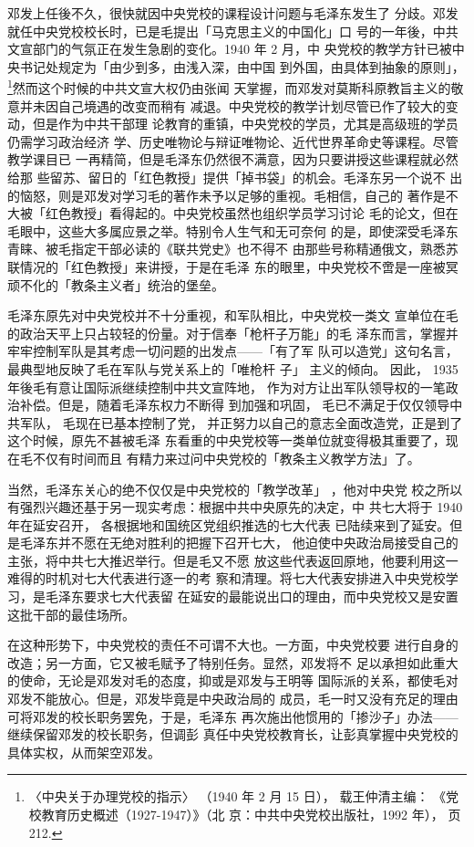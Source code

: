 邓发上任後不久，很快就因中央党校的课程设计问题与毛泽东发生了
分歧。邓发就任中央党校校长时，已是毛提出「马克思主义的中国化」口
号的一年後，中共文宣部门的气氛正在发生急剧的变化。1940 年 2 月，中
央党校的教学方针已被中央书记处规定为「由少到多，由浅入深，由中国
到外国，由具体到抽象的原则」， \footnote{〈中央关于办理党校的指示〉
（1940 年 2 月 15 日），
载王仲清主编：
《党校教育历史概述（1927-1947）》（北
京：中共中央党校出版社，1992 年），
页 212.}然而这个时候的中共文宣大权仍由张闻
天掌握，而邓发对莫斯科原教旨主义的敬意并未因自己境遇的改变而稍有
减退。中央党校的教学计划尽管已作了较大的变动，但是作为中共干部理
论教育的重镇，中央党校的学员，尤其是高级班的学员仍需学习政治经济
学、历史唯物论与辩证唯物论、近代世界革命史等课程。尽管教学课目已
一再精简，但是毛泽东仍然很不满意，因为只要讲授这些课程就必然给那
些留苏、留日的「红色教授」提供「掉书袋」的机会。毛泽东另一个说不
出的恼怒，则是邓发对学习毛的著作未予以足够的重视。毛相信，自己的
著作是不大被「红色教授」看得起的。中央党校虽然也组织学员学习讨论
毛的论文，但在毛眼中，这些大多属应景之举。特别令人生气和无可奈何
的是，即使深受毛泽东青睐、被毛指定干部必读的《联共党史》也不得不
由那些号称精通俄文，熟悉苏联情况的「红色教授」来讲授，于是在毛泽
东的眼里，中央党校不啻是一座被冥顽不化的「教条主义者」统治的堡垒。

毛泽东原先对中央党校并不十分重视，和军队相比，中央党校一类文
宣单位在毛的政治天平上只占较轻的份量。对于信奉「枪杆子万能」的毛
泽东而言，掌握并牢牢控制军队是其考虑一切问题的出发点——「有了军
队可以造党」这句名言，最典型地反映了毛在军队与党关系上的「唯枪杆
子」
主义的倾向。
因此，
1935 年後毛有意让国际派继续控制中共文宣阵地，
作为对方让出军队领导权的一笔政治补偿。但是，随着毛泽东权力不断得
到加强和巩固，
毛已不满足于仅仅领导中共军队，
毛现在已基本控制了党，
并正努力以自己的意志全面改造党，正是到了这个时候，原先不甚被毛泽
东看重的中央党校等一类单位就变得极其重要了，现在毛不仅有时间而且
有精力来过问中央党校的「教条主义教学方法」了。

当然，毛泽东关心的绝不仅仅是中央党校的「教学改革」
，他对中央党
校之所以有强烈兴趣还基于另一现实考虑：根据中共中央原先的决定，中
共七大将于 1940 年在延安召开，
各根据地和国统区党组织推选的七大代表
已陆续来到了延安。但是毛泽东并不愿在无绝对胜利的把握下召开七大，
他迫使中央政治局接受自己的主张，将中共七大推迟举行。但是毛又不愿
放这些代表返回原地，他要利用这一难得的时机对七大代表进行逐一的考
察和清理。将七大代表安排进入中央党校学习，是毛泽东要求七大代表留
在延安的最能说出口的理由，而中央党校又是安置这批干部的最佳场所。

在这种形势下，中央党校的责任不可谓不大也。一方面，中央党校要
进行自身的改造；另一方面，它又被毛赋予了特别任务。显然，邓发将不
足以承担如此重大的使命，无论是邓发对毛的态度，抑或是邓发与王明等
国际派的关系，都使毛对邓发不能放心。但是，邓发毕竟是中央政治局的
成员，毛一时又没有充足的理由可将邓发的校长职务罢免，于是，毛泽东
再次施出他惯用的「掺沙子」办法——继续保留邓发的校长职务，但调彭
真任中央党校教育长，让彭真掌握中央党校的具体实权，从而架空邓发。

